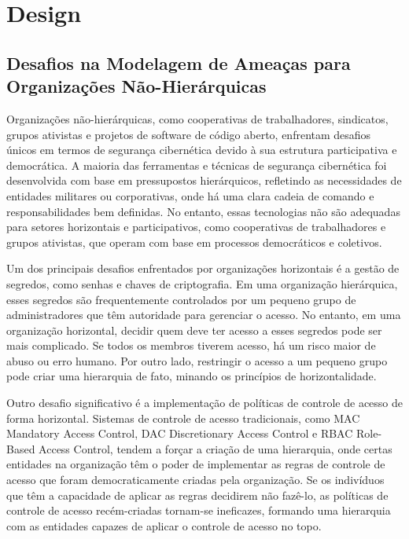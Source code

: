 
%

\chapter{Design}
\label{cha:design}

\glsresetall

\section{Desafios na Modelagem de Ameaças para Organizações Não-Hierárquicas}
\label{sec:introduction}

Organizações não-hierárquicas, como cooperativas de trabalhadores, sindicatos,
grupos ativistas e projetos de software de código aberto, enfrentam desafios únicos
em termos de segurança cibernética devido à sua estrutura participativa e
democrática. A maioria das ferramentas e técnicas de segurança cibernética foi desenvolvida
com base em pressupostos hierárquicos, refletindo as necessidades de entidades
militares ou corporativas, onde há uma clara cadeia de comando e responsabilidades bem
definidas. No entanto, essas tecnologias não são adequadas para setores horizontais e
participativos, como cooperativas de trabalhadores e grupos ativistas, que operam com base em
processos democráticos e coletivos. 

Um dos principais desafios enfrentados por organizações horizontais é a gestão
de segredos, como senhas e chaves de criptografia. Em uma organização
hierárquica, esses segredos são frequentemente controlados por um pequeno grupo de
administradores que têm autoridade para gerenciar o acesso. No entanto, em uma organização
horizontal, decidir quem deve ter acesso a esses segredos pode ser mais complicado. Se
todos os membros tiverem acesso, há um risco maior de abuso ou erro humano. Por
outro lado, restringir o acesso a um pequeno grupo pode criar uma hierarquia de
fato, minando os princípios de horizontalidade. 

Outro desafio significativo é a implementação de políticas de controle de
acesso de forma horizontal. Sistemas de controle de acesso tradicionais, como MAC
Mandatory Access Control, DAC Discretionary Access Control e RBAC Role-Based Access
Control, tendem a forçar a criação de uma hierarquia, onde certas entidades na
organização têm o poder de implementar as regras de controle de acesso que foram
democraticamente criadas pela organização. Se os indivíduos que têm a capacidade de aplicar as
regras decidirem não fazê-lo, as políticas de controle de acesso recém-criadas
tornam-se ineficazes, formando uma hierarquia com as entidades capazes de aplicar o
controle de acesso no topo. 

